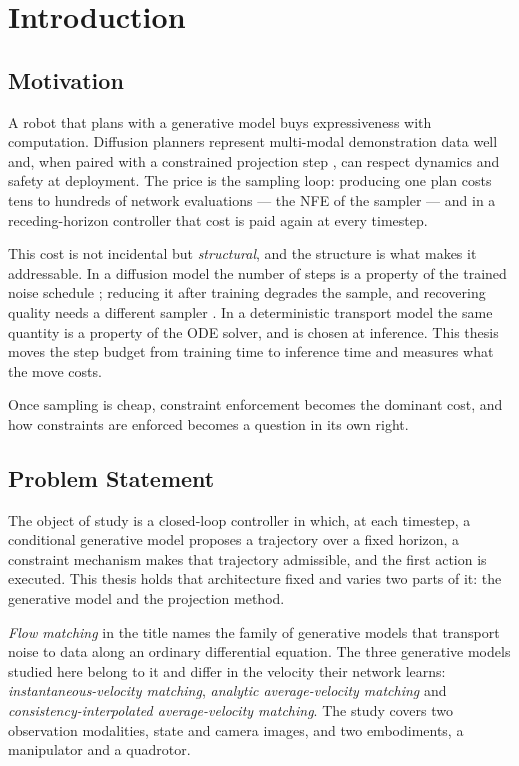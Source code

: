 \documentclass[headsepline,footsepline,footinclude=false,oneside,fontsize=11pt,paper=a4,listof=totoc,bibliography=totoc]{scrbook}
\theoremstyle{definition}
\theoremstyle{plain}
\theoremstyle{remark}
\begin{document}
\chapter{Introduction}\label{ch:introduction}

\section{Motivation}\label{sec:intro:motivation}

A robot that plans with a generative model buys expressiveness with computation. Diffusion
planners \parencite{janner2022planning,chi2023diffusion} represent multi-modal demonstration data
\parencite{jia2024towards} well and, when paired with a constrained projection step
\parencite{romer2025diffusion}, can respect dynamics and safety at deployment. The price is the sampling
loop: producing one plan costs tens to hundreds of network evaluations --- the \ac{NFE} of the
sampler --- and in a receding-horizon controller that cost is paid again at every timestep.

This cost is not incidental but \emph{structural}, and the structure is what makes it
addressable. In a diffusion model the number of steps is a
property of the trained noise schedule \parencite{ho2020denoising}; reducing it after training
degrades the sample, and recovering quality needs a different sampler
\parencite{song2021denoising}. In a deterministic transport model \parencite{lipman2023flow} the same
quantity is a property of the \ac{ODE} solver, and is chosen at inference. This thesis moves the
step budget from training time to inference time and measures what the move costs.

Once sampling is cheap, constraint enforcement becomes the dominant cost, and how constraints are
enforced becomes a question in its own right.

\section{Problem Statement}\label{sec:intro:problem}

The object of study is a closed-loop controller in which, at each timestep, a conditional
generative model proposes a trajectory over a fixed horizon, a constraint mechanism makes
that trajectory admissible, and the first action is executed. This thesis holds that
architecture fixed and varies two parts of it: the generative model and the projection method.

\emph{Flow matching} in the title names the family of generative models that transport noise to data
along an ordinary differential equation. The three generative models studied here belong to it and
differ in the velocity their network learns: \emph{instantaneous-velocity matching},
\emph{analytic average-velocity matching} and \emph{consistency-interpolated average-velocity
matching}. The study covers two observation modalities, state and camera images, and two embodiments, a manipulator
and a quadrotor.
\end{document}
